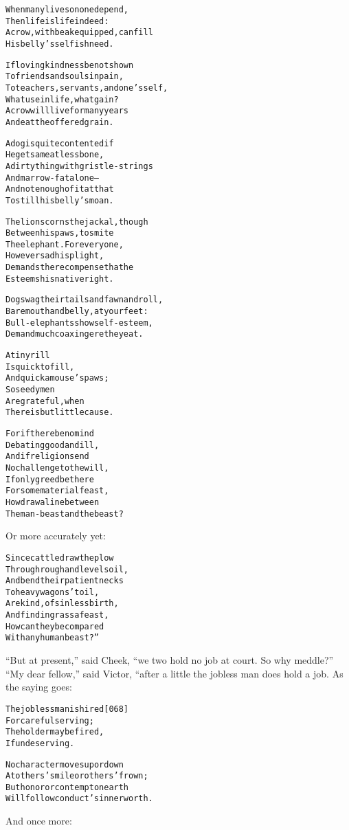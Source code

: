 \documentclass{article}
\renewenvironment{verbatim}{\begin{alltt}\normalfont\begin{centering}}{\end{centering}\end{alltt}}
\begin{document}
\begin{verbatim}
When many lives on one depend,
    Then life is life indeed:
A crow, with beak equipped, can fill
    His belly's selfish need.

If loving kindness be not shown
    To friends and souls in pain,
To teachers, servants, and one's self,
    What use in life, what gain?
A crow will live for many years
    And eat the offered grain.

A dog is quite contented if
    He gets a meatless bone,
A dirty thing with gristle-strings
    And marrow-fat alone--
And not enough of it at that
    To still his belly's moan.

The lion scorns the jackal, though
    Between his paws, to smite
The elephant. For everyone,
    However sad his plight,
Demands the recompense that he
    Esteems his native right.

Dogs wag their tails and fawn and roll,
    Bare mouth and belly, at your feet:
Bull-elephants show self-esteem,
    Demand much coaxing ere they eat.

A tiny rill
Is quick to fill,
    And quick a mouse's paws;
So seedy men
Are grateful, when
    There is but little cause.

For if there be no mind
    Debating good and ill,
And if religion send
    No challenge to the will,
If only greed be there
    For some material feast,
How draw a line between
    The man-beast and the beast?
\end{verbatim}
Or more accurately yet:

\begin{verbatim}
Since cattle draw the plow
    Through rough and level soil,
And bend their patient necks
    To heavy wagons' toil,
Are kind, of sinless birth,
    And find in grass a feast,
How can they be compared
    With any human beast?”
\end{verbatim}
``But at present,'' said Cheek,
``we two hold no job at court. So why meddle?'' ``My dear fellow,''
said Victor, “after a little the jobless man does hold a job. As
the saying goes:

\begin{verbatim}
The jobless man is hired                                [068]
    For careful serving;
The holder may be fired,
    If undeserving.

No character moves up or down
At others' smile or others' frown;
But honor or contempt on earth
Will follow conduct's inner worth.
\end{verbatim}
And once more:
\end{document}

